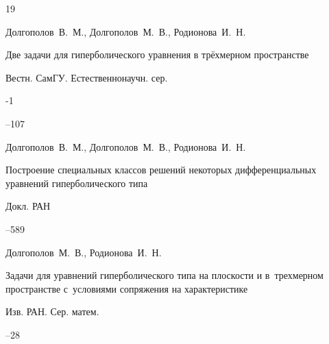 \begin{thebibliography}{19}




\by Долгополов~В.~М., Долгополов~М.~В., Родионова~И.~Н.

\paper Две задачи для гиперболического уравнения в трёхмерном пространстве

\jour  Вестн. СамГУ. Естественнонаучн. сер.



-1

--107




\by Долгополов~В.~М., Долгополов~М.~В., Родионова~И.~Н.

\paper Построение специальных классов решений некоторых дифференциальных уравнений гиперболического типа

\jour Докл. РАН




--589







\by Долгополов~М.~В.,  Родионова~И.~Н.

\paper Задачи для уравнений гиперболического типа на плоскости и в~трехмерном пространстве с~условиями сопряжения на характеристике

\jour Изв. РАН. Сер. матем.




--28







\end{thebibliography}
